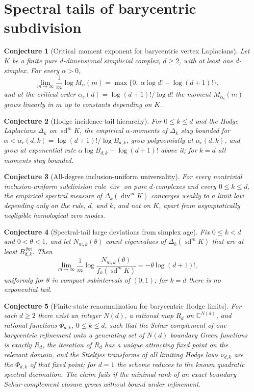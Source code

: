 \documentclass[11pt]{article}
\newtheorem{conjecture}{Conjecture}
\theoremstyle{definition}
\begin{document}
\section{Spectral tails of barycentric subdivision}

\begin{conjecture}[Critical moment exponent for barycentric vertex Laplacians]\label{ac1}
Let $K$ be a finite pure $d$-dimensional simplicial complex, $d\ge2$, with at least one $d$-simplex.  For every $\alpha>0$,
\[
\lim_{m\to\infty}\frac1m\log M_\alpha(m)=\max\{0,\ \alpha\log d!-\log(d+1)!\},
\]
and at the critical order $\alpha_c(d)=\log(d+1)!/\log d!$ the moment $M_{\alpha_c}(m)$ grows linearly in $m$ up to constants depending on $K$.
\end{conjecture}

\begin{conjecture}[Hodge incidence-tail hierarchy]\label{ac2}
For $0\le k\le d$ and the Hodge Laplacians $\Delta_k$ on $\operatorname{sd}^mK$, the empirical $\alpha$-moments of $\Delta_k$ stay bounded for $\alpha<\alpha_c(d,k)=\log(d+1)!/\log B_{d,k}$, grow polynomially at $\alpha_c(d,k)$, and grow at exponential rate $\alpha\log B_{d,k}-\log(d+1)!$ above it; for $k=d$ all moments stay bounded.
\end{conjecture}

\begin{conjecture}[All-degree inclusion-uniform universality]\label{ac3}
For every nontrivial inclusion-uniform subdivision rule $\operatorname{div}$ on pure $d$-complexes and every $0\le k\le d$, the empirical spectral measure of $\Delta_k(\operatorname{div}^mK)$ converges weakly to a limit law depending only on the rule, $d$, and $k$, and not on $K$, apart from asymptotically negligible homological zero modes.
\end{conjecture}

\begin{conjecture}[Spectral-tail large deviations from simplex age]\label{ac4}
Fix $0\le k<d$ and $0<\theta<1$, and let $N_{m,k}(\theta)$ count eigenvalues of $\Delta_k(\operatorname{sd}^mK)$ that are at least $B_{d,k}^{\,\theta m}$.  Then
\[
\lim_{m\to\infty}\frac1m\log\frac{N_{m,k}(\theta)}{f_k(\operatorname{sd}^mK)}=-\theta\log(d+1)!,
\]
uniformly for $\theta$ in compact subintervals of $(0,1)$; for $k=d$ there is no exponential tail.
\end{conjecture}

\begin{conjecture}[Finite-state renormalization for barycentric Hodge limits]\label{ac5}
For each $d\ge2$ there exist an integer $N(d)$, a rational map $R_d$ on $\mathbb C^{N(d)}$, and rational functions $\Phi_{d,k}$, $0\le k\le d$, such that the Schur complement of one barycentric refinement onto a generating set of $N(d)$ boundary Green functions is exactly $R_d$, the iteration of $R_d$ has a unique attracting fixed point on the relevant domain, and the Stieltjes transforms of all limiting Hodge laws $\nu_{d,k}$ are the $\Phi_{d,k}$ of that fixed point; for $d=1$ the scheme reduces to the known quadratic spectral decimation.  The claim fails if the minimal rank of an exact boundary Schur-complement closure grows without bound under refinement.
\end{conjecture}
\end{document}
